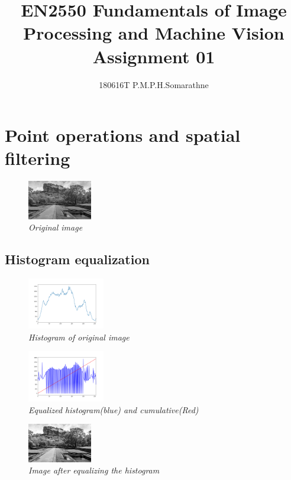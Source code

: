 \documentclass[11pt,twocolumn]{article}
\title{{\textbf{EN2550 Fundamentals of Image Processing and Machine Vision\\Assignment 01}}}
\author{{\Large 180616T P.M.P.H.Somarathne}}
\begin{document}
\maketitle

\section{Point operations and spatial filtering}

\begin{figure}[H]
\center
\includegraphics[width=0.25\textwidth]{sigiriya_gray.png}
\caption{{\small \textit{Original image}}}
\end{figure}

\subsection{Histogram equalization}
\begin{figure}[H]
\center
\includegraphics[width=0.3\textwidth]{Histogram.png}
\caption{{\small \textit{Histogram of original image}}}
\end{figure}
\begin{figure}[H]
\center
\includegraphics[width=0.3\textwidth]{Equalized_Histogram.png}
\caption{{\small \textit{Equalized histogram(blue) and cumulative(Red)}}}
\end{figure}
\begin{figure}[H]
\center
\includegraphics[width=0.25\textwidth]{Equalized_Image.png}
\caption{{\small \textit{Image after equalizing the histogram}}}
\end{figure}
\end{document}
